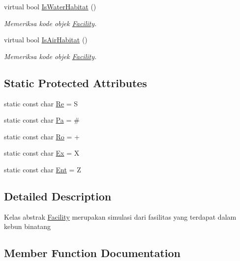 \begin{DoxyCompactItemize}
virtual bool \hyperlink{classFacility_acaa21936227ef88450ab6834b5711a5c}{Is\+Water\+Habitat} ()
\begin{DoxyCompactList}\small\item\em Memeriksa kode objek \hyperlink{classFacility}{Facility}. \end{DoxyCompactList}\item 
virtual bool \hyperlink{classFacility_a6092a86c14a7c2003e2b020aa28fc06f}{Is\+Air\+Habitat} ()
\begin{DoxyCompactList}\small\item\em Memeriksa kode objek \hyperlink{classFacility}{Facility}. \end{DoxyCompactList}\end{DoxyCompactItemize}
\subsection*{Static Protected Attributes}
\begin{DoxyCompactItemize}
\item 
static const char \hyperlink{classFacility_a0c187566e945c796ffb5679d6c34287b}{Re} = \textquotesingle{}S\textquotesingle{}
\item 
static const char \hyperlink{classFacility_a5588f173a18205498f4c3bfd3c04d28c}{Pa} = \textquotesingle{}\#\textquotesingle{}
\item 
static const char \hyperlink{classFacility_ac6279190b255cdb87040af59e849543a}{Ro} = \textquotesingle{}+\textquotesingle{}
\item 
static const char \hyperlink{classFacility_ad30246918df96bd5a4e63063a1a1ae2e}{Ex} = \textquotesingle{}X\textquotesingle{}
\item 
static const char \hyperlink{classFacility_a2946221d924add37fc2a4aab5912dc60}{Ent} = \textquotesingle{}Z\textquotesingle{}
\end{DoxyCompactItemize}


\subsection{Detailed Description}
Kelas abstrak \hyperlink{classFacility}{Facility} merupakan simulasi dari fasilitas yang terdapat dalam kebun binatang 

\subsection{Member Function Documentation}
